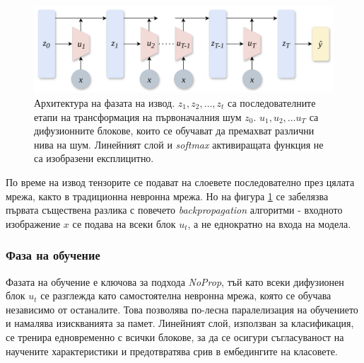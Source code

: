 \documentclass[a4paper,11pt]{article}
\begin{document}
\begin{figure}[H]
    \centering
    \includegraphics[width=6.26in,keepaspectratio]{images/NoProp Inference Architecture.png}
    \caption{Архитектура на фазата на извод. $z_1, z_2, \dots, z_t$ са последователните етапи на трансформация на първоначалния шум $z_0$. $u_1, u_2, \dots u_T$ са дифузионните блокове, които се обучават да премахват различни нива на шум. Линейният слой и \emph{softmax} активиращата функция не са изобразени експлицитно.}
    \label{no_prop_arch}
\end{figure}
По време на извод тензорите се подават на слоевете последователно през цялата мрежа, както в традиционна невронна мрежа. Но на фигура \ref{no_prop_arch} се забелязва първата съществена разлика с повечето \emph{backpropagation} алгоритми - входното изображение $x$ се подава на всеки блок $u_t$, а не еднократно на входа на модела. 

\subsubsection{Фаза на обучение}
Фазата на обучение е ключова за подхода \emph{NoProp}, тъй като всеки дифузионен блок \(u_t\) се разглежда като самостоятелна невронна мрежа, която се обучава независимо от останалите. Това позволява по-лесна паралелизация на обучението и намалява изискванията за памет. Линейният слой, използван за класификация, се тренира едновременно с всички блокове, за да се осигури съгласуваност на научените характеристики и предотвратява срив в ембедингите на класовете.
\end{document}

